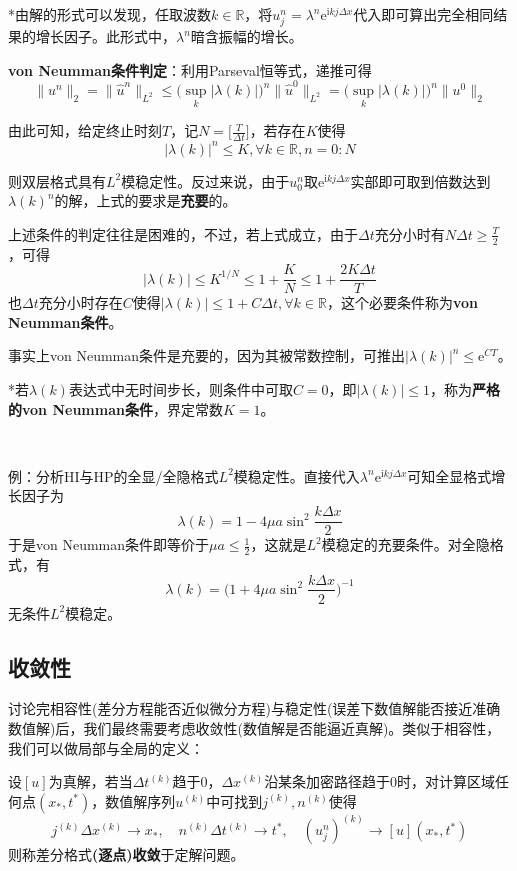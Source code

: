 \documentclass[a4paper,UTF8,fontset=windows]{ctexart}
\begin{document}
*由解的形式可以发现，任取波数$k\in\mathbb{R}$，将$u_j^n=\lambda^n\mathrm{e}^{\mathrm{i}kj\Delta x}$代入即可算出完全相同结果的增长因子。此形式中，$\lambda^n$暗含振幅的增长。

\textbf{von Neumman条件判定}：利用Parseval恒等式，递推可得
$$\|u^n\|_2=\|\hat{u}^n\|_{L^2}\le\big(\sup_k|\lambda(k)|\big)^n\|\hat{u}^0\|_{L^2}=\big(\sup_k|\lambda(k)|\big)^n\|u^0\|_2$$

由此可知，给定终止时刻$T$，记$N=\big[\frac{T}{\Delta t}\big]$，若存在$K$使得
$$|\lambda(k)|^n\le K,\forall k\in\mathbb{R},n=0:N$$

则双层格式具有$L^2$模稳定性。反过来说，由于$u_0^n$取$\mathrm{e}^{\mathrm{i}kj\Delta x}$实部即可取到倍数达到$\lambda(k)^n$的解，上式的要求是\textbf{充要}的。

上述条件的判定往往是困难的，不过，若上式成立，由于$\Delta t$充分小时有$N\Delta t\ge\frac{T}{2}$，可得
$$|\lambda(k)|\le K^{1/N}\le1+\frac{K}{N}\le1+\frac{2K\Delta t}{T}$$
也$\Delta t$充分小时存在$C$使得$|\lambda(k)|\le 1+C\Delta t,\forall k\in\mathbb{R}$，这个必要条件称为\textbf{von Neumman条件}。

事实上von Neumman条件是充要的，因为其被常数控制，可推出$|\lambda(k)|^n\le\mathrm{e}^{CT}$。

*若$\lambda(k)$表达式中无时间步长，则条件中可取$C=0$，即$|\lambda(k)|\le1$，称为\textbf{严格的von Neumman条件}，界定常数$K=1$。

\

例：分析HI与HP的全显/全隐格式$L^2$模稳定性。直接代入$\lambda^n\mathrm{e}^{\mathrm{i}kj\Delta x}$可知全显格式增长因子为
$$\lambda(k)=1-4\mu a\sin^2\frac{k\Delta x}{2}$$
于是von Neumman条件即等价于$\mu a\le\frac{1}{2}$，这就是$L^2$模稳定的充要条件。对全隐格式，有
$$\lambda(k)=\bigg(1+4\mu a\sin^2\frac{k\Delta x}{2}\bigg)^{-1}$$
无条件$L^2$模稳定。

\subsection{收敛性}
讨论完相容性(差分方程能否近似微分方程)与稳定性(误差下数值解能否接近准确数值解)后，我们最终需要考虑收敛性(数值解是否能逼近真解)。类似于相容性，我们可以做局部与全局的定义：

设$[u]$为真解，若当$\Delta t^{(k)}$趋于0，$\Delta x^{(k)}$沿某条加密路径趋于0时，对计算区域任何点$(x_*,t^*)$，数值解序列$u^{(k)}$中可找到$j^{(k)},n^{(k)}$使得
$$j^{(k)}\Delta x^{(k)}\to x_*,\quad n^{(k)}\Delta t^{(k)}\to t^*,\quad(u_j^n)^{(k)}\to [u](x_*,t^*)$$
则称差分格式\textbf{(逐点)收敛}于定解问题。
\end{document}
